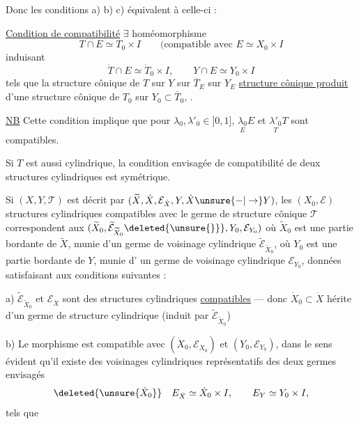 Donc les conditions a) b) c) équivalent à celle-ci :

\uline{Condition de compatibilité} $\exists$ homéomorphisme
\[
T\cap E\simeq T_0\times I
\qquad\text{(compatible avec }E\simeq X_0\times I
\]
induisant
\[
\dot T\cap E\simeq\dot T_0\times I,\qquad Y\cap E\simeq Y_0\times I
\]
tels que la structure cônique de $T$ sur $Y$
 sur $\overline T_E$ sur $Y_E$
 
\uline{structure cônique produit} 
d'une structure cônique de
$T_0$ sur $Y_0\subset\overline T_0$, .

\uline{NB} Cette condition implique que pour $\lambda_0,\lambda'_0\in]0,1]$,
$\underset{E}{\lambda_0}E$ et $\underset{T}{\lambda'_0}T$ sont compatibles.

Si $T$ est aussi cylindrique, la condition
envisagée de compatibilité de deux structures
cylindriques est symétrique.

Si $(X,Y,\mathcal T)$ est décrit par $(\widetilde X,\dot X,\mathcal E_{\dot X},Y,\dot X\unsure{-|\to}Y)$,
les  $(X_0,\mathcal E)$  structures cylindriques compatibles
avec le germe de structure cônique $\mathcal T$ correspondent
aux 
$(\widetilde X_0,\widetilde{\mathcal E}_{\widetilde X_0}\deleted{\unsure{\}}},Y_0,\mathcal E_{Y_0})$
où $\widetilde X_0$ est une partie bordante de  $\widetilde X$, munie
d'un germe de voisinage cylindrique $\widetilde{\mathcal E}_{\widetilde X_0}$,
où $Y_0$ est une partie bordante de $Y$, munie d'
un germe de  voisinage cylindrique
$\mathcal E_{Y_0}$,  données satisfaisant aux conditions
suivantes :

a) $\widetilde{\mathcal E}_{\widetilde X_0}$ et $\mathcal E_{\dot X}$ sont des
 structures cylindriques
\uline{compatibles} --- donc $\dot X_0\subset\dot X$
hérite d'un
germe de structure cylindrique  (induit par
$\widetilde{\mathcal E}_{\widetilde X_0}$)

b) Le morphisme
est compatible
avec $(\dot X_0,\mathcal E_{\dot X_0})$ et $(Y_0,\mathcal E_{Y_0})$, dans le sens
évident 
qu'il existe des voisinages cylindriques
représentatifs des deux germes envisagés
\[
\deleted{\unsure{\dot X_0}}\quad
E_{\dot X}\simeq\dot X_0\times I,\qquad E_Y\simeq Y_0\times I,
\]
tels que

